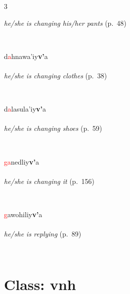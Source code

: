 \documentclass[oneside,openany]{book}%
\begin{document}
\begin{multicols}{3}
\begin{minipage}[t]{\linewidth}
\noindent \textit{he/she is changing his/her pants} (p.~48)
\end{minipage}\\[1em]%
\begin{minipage}[t]{\linewidth}
\raggedright\noindent d\textcolor{Red}{a}hnawa'iy\textbf{v'}a\\
\\
\noindent \textit{he/she is changing clothes} (p.~38)
\end{minipage}\\[1em]%
\begin{minipage}[t]{\linewidth}
\raggedright\noindent d\textcolor{Red}{a}lasula'iy\textbf{v'}a\\
\\
\noindent \textit{he/she is changing shoes} (p.~59)
\end{minipage}\\[1em]%
\begin{minipage}[t]{\linewidth}
\raggedright\noindent \textcolor{Red}{ga}nedliy\textbf{v'}a\\
\\
\noindent \textit{he/she is changing it} (p.~156)
\end{minipage}\\[1em]%
\begin{minipage}[t]{\linewidth}
\raggedright\noindent \textcolor{Red}{g}awohiliy\textbf{v'}a\\
\\
\noindent \textit{he/she is replying} (p.~89)
\end{minipage}\\[1em]%
\end{multicols}%
\vspace{1em}%
\needspace{3in}%
\section*{Class: vnh}%
%
\needspace{1.5in}%
\end{document}
